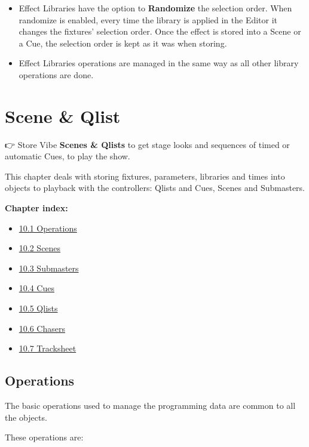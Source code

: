 \documentclass[
]{article}
\providecommand{\tightlist}{%
  \setlength{\itemsep}{0pt}\setlength{\parskip}{0pt}}
\begin{document}
\begin{itemize}
\item
  Effect Libraries have the option to \textbf{Randomize} the selection order. When randomize is enabled, every time the library is applied in the Editor it changes the fixtures' selection order. Once the effect is stored into a Scene or a Cue, the selection order is kept as it was when storing.
\item
  Effect Libraries operations are managed in the same way as all other library operations are done.
\end{itemize}

\hypertarget{scene-qlist}{%
\section{Scene \& Qlist}\label{scene-qlist}}

👉 Store Vibe \textbf{Scenes \& Qlists} to get stage looks and sequences of timed or automatic Cues, to play the show.

This chapter deals with storing fixtures, parameters, libraries and times into objects to playback with the controllers: Qlists and Cues, Scenes and Submasters.

\textbf{Chapter index:}

\begin{itemize}
\tightlist
\item
  \protect\hyperlink{Operations-10.1}{10.1 Operations}
\item
  \protect\hyperlink{Scenes-10.2}{10.2 Scenes}
\item
  \protect\hyperlink{Submasters-10.3}{10.3 Submasters}
\item
  \protect\hyperlink{Cues-10.4}{10.4 Cues}
\item
  \protect\hyperlink{Qlists-10.5}{10.5 Qlists}
\item
  \protect\hyperlink{Chasers-10.6}{10.6 Chasers}
\item
  \protect\hyperlink{Tracksheet-10.7}{10.7 Tracksheet}
\end{itemize}

\hypertarget{Operations-10.1}{%
\subsection{Operations}\label{Operations-10.1}}

The basic operations used to manage the programming data are common to all the objects.

These operations are:
\end{document}
